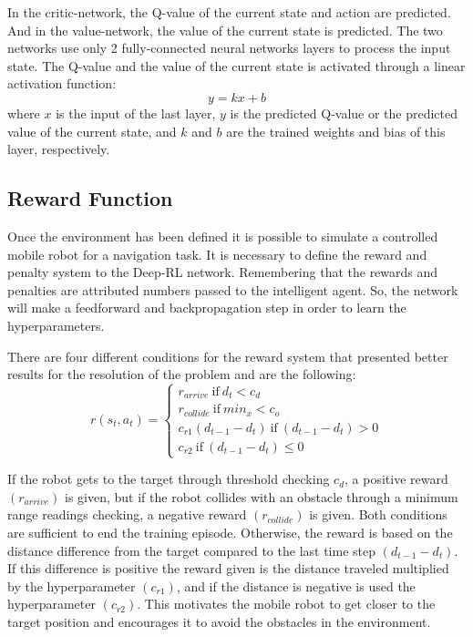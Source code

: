 In the critic-network, the Q-value of the current state and action are predicted.
And in the value-network, the value of the current state is predicted.
The two networks use only 2 fully-connected neural networks layers to process the input state.
The Q-value and the value of the current state is activated through a linear activation function:
\begin{equation}
y = kx +b
\end{equation}
where $x$ is the input of the last layer, $y$ is the predicted Q-value or the predicted value of the current state, and $k$ and $b$ are the trained weights and bias of this layer, respectively.

\subsection{Reward Function}

Once the environment has been defined it is possible to simulate a controlled mobile robot for a navigation task.
It is necessary to define the reward and penalty system to the Deep-RL network.
Remembering that the rewards and penalties are attributed numbers passed to the intelligent agent.
So, the network will make a feedforward and backpropagation step in order to learn the hyperparameters.

There are four different conditions for the reward system that presented better results for the resolution of the problem and are the following:
\begin{equation}
r (s_t, a_t) = 
\begin{cases}
r_{arrive} \ \textrm{if} \ d_t < c_d
\\
r_{collide} \ \textrm{if}\ min_x < c_o
\\
c_{r1}(d_{t-1} - d_t) \ \textrm{if} \ (d_{t-1} - d_t) > 0
\\
c_{r2} \ \textrm{if} \ (d_{t-1} - d_t) \leq 0
\end{cases}
\end{equation}

If the robot gets to the target through threshold checking $c_d$, a positive reward $(r_{arrive})$ is given, but if the robot collides with an obstacle through a minimum range readings checking, a negative reward $(r_{collide})$ is given.
Both conditions are sufficient to end the training episode.
Otherwise, the reward is based on the distance difference from the target compared to the last time step $(d_{t-1} - d_t)$. 
If this difference is positive the reward given is the distance traveled multiplied by the hyperparameter $(c_{r1})$, and if the distance is negative is used the hyperparameter $(c_{r2})$.
This motivates the mobile robot to get closer to the target position and encourages it to avoid the obstacles in the environment.

